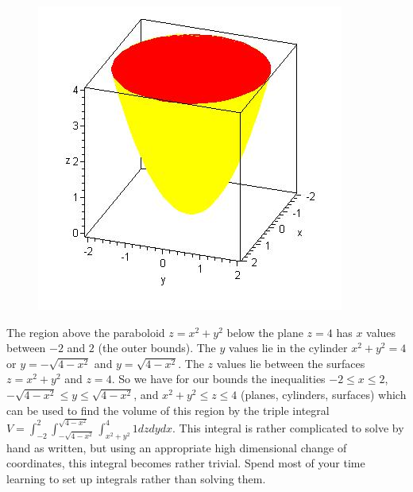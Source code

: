 \begin{figure}
\newcommand{\myheight}{.8in}
\includegraphics[height=\myheight]{10-SurfaceTripleIntegrals/support/triple-1}
\end{figure}
The region above the paraboloid $z=x^2+y^2$ below the plane $z=4$ has
$x$ values between $-2$ and $2$ (the outer bounds). The $y$ values lie
in the cylinder $x^2+y^2=4$ or $y=-\sqrt{4-x^2}$ and $y=\sqrt{4-x^2}$.
The $z$ values lie between the surfaces $z=x^2+y^2$ and $z=4$.  So we
have for our bounds the inequalities $-2\leq x\leq 2$, $-\sqrt{4-x^2}\leq y\leq
\sqrt{4-x^2}$, and $x^2+y^2\leq z\leq 4$ (planes, cylinders, surfaces) which
can be used to find the volume of this region by the triple integral
$V=\int_{-2}^{2}\int_{-\sqrt{4-x^2}}^{\sqrt{4-x^2}}\int_{x^2+y^2}^{4}1 dz dy
dx$. This integral is rather complicated to solve by hand as written,
but using an appropriate high dimensional change of coordinates, this
integral becomes rather trivial.  Spend most of your time learning to
set up integrals rather than solving them.

